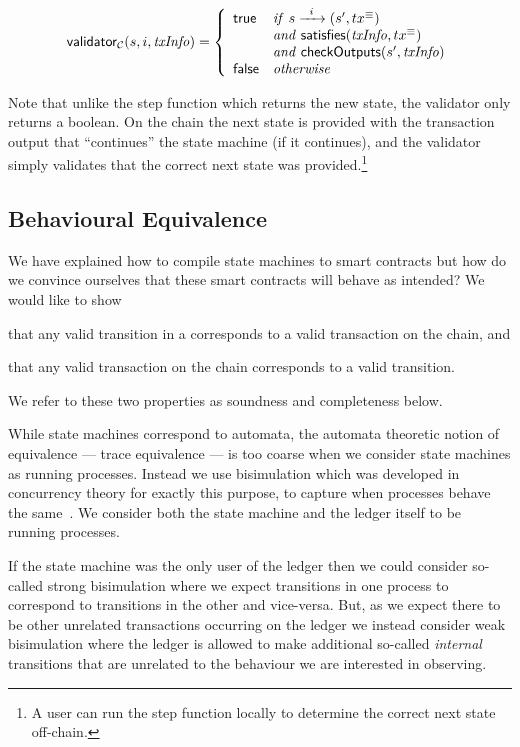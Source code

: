 \[
\mathsf{validator}_\mathcal{C}(s, i, \mathit{txInfo}) = \left\{
  \begin{array}{lll}
  \textsf{true}  & \mathit{if} \  s \xrightarrow{\hspace{5pt} i \hspace{5pt}} (s' , tx^\equiv)  \\
         & \mathit{and} \ \mathsf{satisfies}(\mathit{txInfo}, tx^\equiv) \\
         & \mathit{and} \ \mathsf{checkOutputs}(s', \mathit{txInfo}) \\
  \textsf{false} & \mathit{otherwise}
  \end{array}
\right.
\]

\noindent
Note that unlike the step function which returns the new state, the
validator only returns a boolean. On the chain the next state is
provided with the transaction output that ``continues'' the state
machine (if it continues), and the validator simply validates that
the correct next state was provided.\footnote{
A user can run the step function locally to determine the correct next state off-chain.
}

\subsection{Behavioural Equivalence}
We have explained how to compile state machines to smart contracts but
how do we convince ourselves that these smart contracts will behave as
intended? We would like to show
\begin{inparaenum}[(1)]
\item that any valid transition in a \CEM{} corresponds to a valid transaction
  on the chain, and
\item that any valid transaction on the chain corresponds to a valid transition.
\end{inparaenum}
We refer to these two properties as soundness and completeness below.

While state machines correspond to automata, the automata theoretic
notion of equivalence --- trace equivalence --- is too coarse when we
consider state machines as running processes. Instead we use
bisimulation which was developed in concurrency theory for exactly
this purpose, to capture when processes behave the
same~\cite{sangiorgi}. We consider both the state machine and the
ledger itself to be running processes.

If the state machine was the only user of the ledger then we could
consider so-called strong bisimulation where we expect transitions in
one process to correspond to transitions in the other and
vice-versa. But, as we expect there to be other unrelated transactions
occurring on the ledger we instead consider weak bisimulation where
the ledger is allowed to make additional so-called \emph{internal}
transitions that are unrelated to the behaviour we are interested in
observing.

